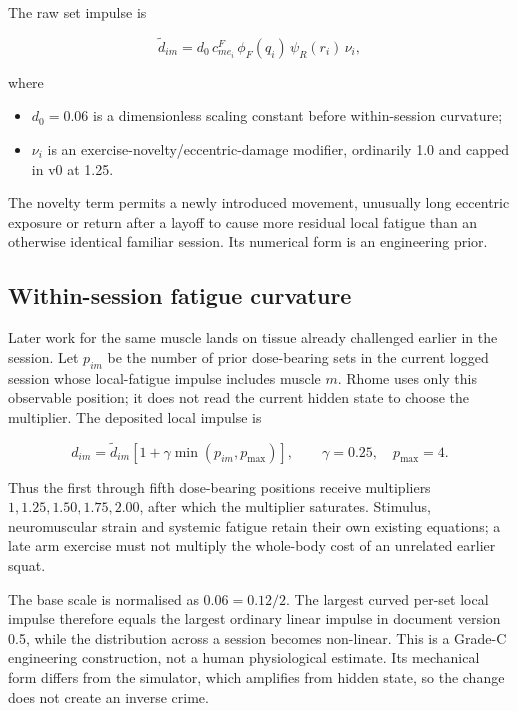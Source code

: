 \documentclass[11pt]{article}
\begin{document}
The raw set impulse is

\begin{equation}
\widetilde d_{im}=d_0\,c^{F}_{m e_i}\,\phi_F(q_i)\,\psi_R(r_i)\,\nu_i,
\end{equation}

where

\begin{itemize}
    \item $d_0=0.06$ is a dimensionless scaling constant before within-session curvature;
    \item $\nu_i$ is an exercise-novelty/eccentric-damage modifier, ordinarily 1.0 and capped in v0 at 1.25.
\end{itemize}

The novelty term permits a newly introduced movement, unusually long eccentric exposure or return after a layoff to cause more residual local fatigue than an otherwise identical familiar session. Its numerical form is an engineering prior.

\subsection{Within-session fatigue curvature}

Later work for the same muscle lands on tissue already challenged earlier in
the session. Let $p_{im}$ be the number of prior dose-bearing sets in the
current logged session whose local-fatigue impulse includes muscle $m$. Rhome
uses only this observable position; it does not read the current hidden state
to choose the multiplier. The deposited local impulse is

\begin{equation}
d_{im}=\widetilde d_{im}\left[1+\gamma\min(p_{im},p_{\max})\right],
\qquad \gamma=0.25,\quad p_{\max}=4.
\end{equation}

Thus the first through fifth dose-bearing positions receive multipliers
$1,1.25,1.50,1.75,2.00$, after which the multiplier saturates. Stimulus, neuromuscular
strain and systemic fatigue retain their own existing equations; a late arm
exercise must not multiply the whole-body cost of an unrelated earlier squat.

The base scale is normalised as $0.06=0.12/2$. The largest curved per-set
local impulse therefore equals the largest ordinary linear impulse in document
version 0.5, while the distribution across a session becomes non-linear. This
is a Grade-C engineering construction, not a human physiological estimate. Its
mechanical form differs from the simulator, which amplifies from hidden state,
so the change does not create an inverse crime.
\end{document}
